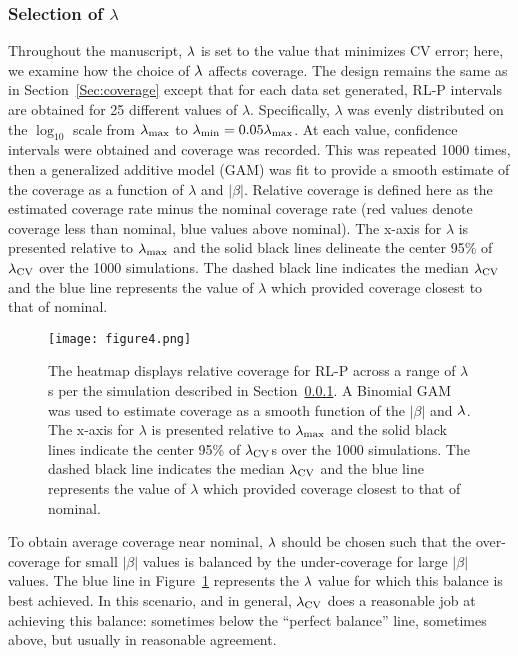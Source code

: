 \subsubsection{Selection of \texorpdfstring{$\lambda$}{lambda}} \label{Sec:lambda}

Throughout the manuscript, $\lambda$ is set to the value that minimizes CV error; here, we examine how the choice of $\lambda$ affects coverage. The design remains the same as in Section~\ref{Sec:coverage} except that for each data set generated, RL-P intervals are obtained for 25 different values of $\lambda$. Specifically, $\lambda$ was evenly distributed on the $\log_{10}$ scale from $\lambda_{\max}$ to $\lambda_{\min} = 0.05 \lambda_{\max}$. At each value, confidence intervals were obtained and coverage was recorded. This was repeated 1000 times, then a generalized additive model (GAM) was fit to provide a smooth estimate of the coverage as a function of $\lambda$ and $|\beta|$. Relative coverage is defined here as the estimated coverage rate minus the nominal coverage rate (red values denote coverage less than nominal, blue values above nominal). The x-axis for $\lambda$ is presented relative to $\lambda_{\max}$ and the solid black lines delineate the center 95\% of $\lambda_{\textrm{CV}}$ over the 1000 simulations. The dashed black line indicates the median $\lambda_{\textrm{CV}}$ and the blue line represents the value of $\lambda$ which provided coverage closest to that of nominal.

\begin{figure}[htb!]
  \begin{center}
    \texttt{[image: figure4.png]}
    \caption{\label{Fig:beta_lambda_heatmap_laplace} The heatmap displays relative coverage for RL-P across a range of $\lambda$s per the simulation described in Section~\ref{Sec:lambda}. A Binomial GAM was used to estimate coverage as a smooth function of the $|\beta|$ and $\lambda$. The x-axis for $\lambda$ is presented relative to $\lambda_{\max}$ and the solid black lines indicate the center 95\% of $\lambda_{\textrm{CV}}$s over the 1000 simulations. The dashed black line indicates the median $\lambda_{\textrm{CV}}$ and the blue line represents the value of $\lambda$ which provided coverage closest to that of nominal.}
  \end{center}
\end{figure}

To obtain average coverage near nominal, $\lambda$ should be chosen such that the over-coverage for small $|\beta|$ values is balanced by the under-coverage for large $|\beta|$ values. The blue line in Figure~\ref{Fig:beta_lambda_heatmap_laplace} represents the $\lambda$ value for which this balance is best achieved. In this scenario, and in general, $\lambda_{\textrm{CV}}$ does a reasonable job at achieving this balance: sometimes below the ``perfect balance'' line, sometimes above, but usually in reasonable agreement.

